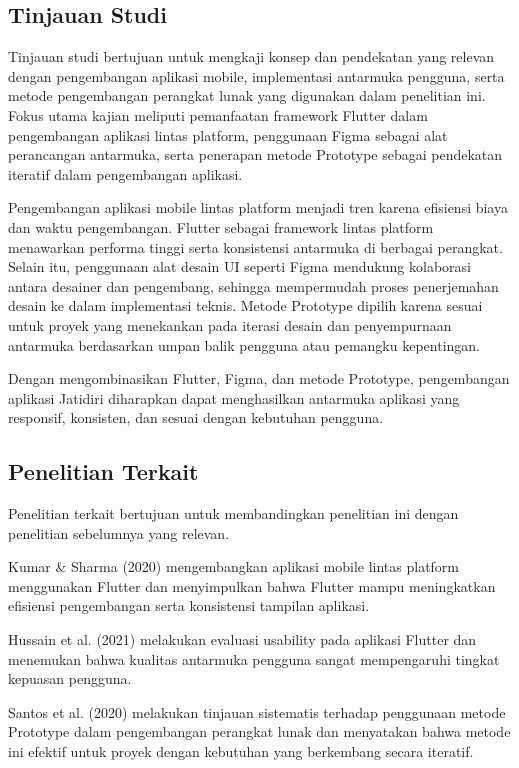 \subsection{Tinjauan Studi}

Tinjauan studi bertujuan untuk mengkaji konsep dan pendekatan yang relevan dengan pengembangan aplikasi mobile, implementasi antarmuka pengguna, serta metode pengembangan perangkat lunak yang digunakan dalam penelitian ini. Fokus utama kajian meliputi pemanfaatan framework Flutter dalam pengembangan aplikasi lintas platform, penggunaan Figma sebagai alat perancangan antarmuka, serta penerapan metode Prototype sebagai pendekatan iteratif dalam pengembangan aplikasi.

Pengembangan aplikasi mobile lintas platform menjadi tren karena efisiensi biaya dan waktu pengembangan. Flutter sebagai framework lintas platform menawarkan performa tinggi serta konsistensi antarmuka di berbagai perangkat. Selain itu, penggunaan alat desain UI seperti Figma mendukung kolaborasi antara desainer dan pengembang, sehingga mempermudah proses penerjemahan desain ke dalam implementasi teknis. Metode Prototype dipilih karena sesuai untuk proyek yang menekankan pada iterasi desain dan penyempurnaan antarmuka berdasarkan umpan balik pengguna atau pemangku kepentingan.

Dengan mengombinasikan Flutter, Figma, dan metode Prototype, pengembangan aplikasi Jatidiri diharapkan dapat menghasilkan antarmuka aplikasi yang responsif, konsisten, dan sesuai dengan kebutuhan pengguna.


\subsection{Penelitian Terkait}

Penelitian terkait bertujuan untuk membandingkan penelitian ini dengan penelitian sebelumnya yang relevan.

Kumar \& Sharma (2020) mengembangkan aplikasi mobile lintas platform menggunakan Flutter dan menyimpulkan bahwa Flutter mampu meningkatkan efisiensi pengembangan serta konsistensi tampilan aplikasi.

Hussain et al. (2021) melakukan evaluasi usability pada aplikasi Flutter dan menemukan bahwa kualitas antarmuka pengguna sangat mempengaruhi tingkat kepuasan pengguna.

Santos et al. (2020) melakukan tinjauan sistematis terhadap penggunaan metode Prototype dalam pengembangan perangkat lunak dan menyatakan bahwa metode ini efektif untuk proyek dengan kebutuhan yang berkembang secara iteratif.

